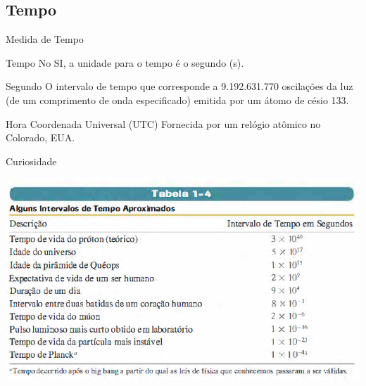\documentclass[xcolor=dvipsnames,table]{beamer}
\begin{document}
	\subsection{Tempo}
	\begin{frame}{Medida de Tempo}
		\begin{block}{Tempo}
			No SI, a unidade para o tempo é o segundo (s).
		\end{block}
		\begin{block}{Segundo}
			O intervalo de tempo que corresponde a 9.192.631.770 oscilações da luz (de um comprimento de onda especificado) emitida por um átomo de césio 133.
		\end{block}
		\begin{block}{Hora Coordenada Universal (UTC)}
			Fornecida por um relógio atômico no Colorado, EUA.
		\end{block}
	\end{frame}
	
	\begin{frame}{Curiosidade}
		\begin{center}
			\includegraphics[scale=0.5]{images/tabela1-4.png}
		\end{center}
	\end{frame}
	
\end{document}
